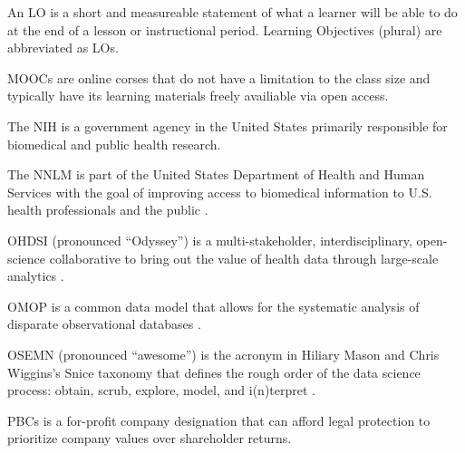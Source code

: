 \documentclass[../main.tex]{subfiles}
\begin{document}
  An LO is a short and measureable statement of what a learner will be able to do at the end of a lesson or instructional period.
  Learning Objectives (plural) are abbreviated as LOs.



  MOOCs are online corses that do not have a limitation to the class size and typically have its learning materials freely availiable via open access.



  The NIH is a government agency in the United States primarily responsible for biomedical and public health research.



  The NNLM is part of the United States Department of Health and Human Services
  with the goal of improving access to biomedical information to U.S. health professionals and the public
  \cite{nationallibraryofmedicineUsNNLM}.



  OHDSI (pronounced ``Odyssey'') is a multi-stakeholder, interdisciplinary, open-science collaborative
  to bring out the value of health data through large-scale analytics
  \cite{observationalhealthdatasciencesandinformaticsOHDSIObservationalHealth}.



  OMOP is a common data model that allows for the systematic analysis of disparate observational databases
  \cite{observationalhealthdatasciencesandinformaticsOMOPCommonData}.



  OSEMN (pronounced ``awesome'') is the acronym in Hiliary Mason and Chris Wiggins's Snice taxonomy that defines
  the rough order of the data science process:
  obtain, scrub, explore, model, and i(n)terpret
  \cite{masonTaxonomyDataScience2010}.



  PBCs is a for-profit company designation that can afford legal protection
  to prioritize company values over shareholder returns.

\end{document}
